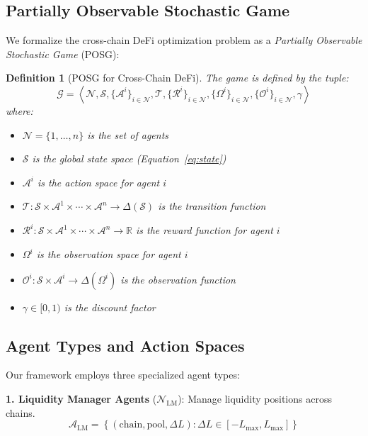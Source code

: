 \documentclass[11pt,a4paper]{article}
\newtheorem{definition}[theorem]{Definition}
\begin{document}
\subsection{Partially Observable Stochastic Game}

We formalize the cross-chain DeFi optimization problem as a \textit{Partially Observable Stochastic Game} (POSG):

\begin{definition}[POSG for Cross-Chain DeFi]
The game is defined by the tuple:
\begin{equation}\label{eq:posg}
\mathcal{G} = \left\langle \mathcal{N}, \mathcal{S}, \{\mathcal{A}^i\}_{i \in \mathcal{N}}, \mathcal{T}, \{\mathcal{R}^i\}_{i \in \mathcal{N}}, \{\Omega^i\}_{i \in \mathcal{N}}, \{\mathcal{O}^i\}_{i \in \mathcal{N}}, \gamma \right\rangle
\end{equation}
where:
\begin{itemize}[leftmargin=2em]
    \item $\mathcal{N} = \{1, \ldots, n\}$ is the set of agents
    \item $\mathcal{S}$ is the global state space (Equation~\ref{eq:state})
    \item $\mathcal{A}^i$ is the action space for agent $i$
    \item $\mathcal{T}: \mathcal{S} \times \mathcal{A}^1 \times \cdots \times \mathcal{A}^n \rightarrow \Delta(\mathcal{S})$ is the transition function
    \item $\mathcal{R}^i: \mathcal{S} \times \mathcal{A}^1 \times \cdots \times \mathcal{A}^n \rightarrow \mathbb{R}$ is the reward function for agent $i$
    \item $\Omega^i$ is the observation space for agent $i$
    \item $\mathcal{O}^i: \mathcal{S} \times \mathcal{A}^i \rightarrow \Delta(\Omega^i)$ is the observation function
    \item $\gamma \in [0,1)$ is the discount factor
\end{itemize}
\end{definition}

\subsection{Agent Types and Action Spaces}

Our framework employs three specialized agent types:

\textbf{1. Liquidity Manager Agents} ($\mathcal{N}_{\text{LM}}$): Manage liquidity positions across chains.
\begin{equation}
\mathcal{A}_{\text{LM}} = \left\{ (\text{chain}, \text{pool}, \Delta L) : \Delta L \in [-L_{\max}, L_{\max}] \right\}
\end{equation}
\end{document}
